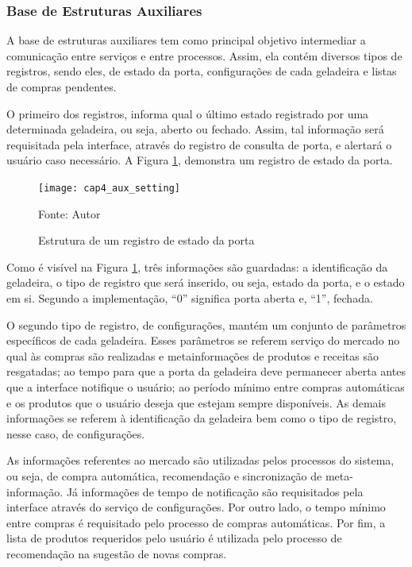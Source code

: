 \subsubsection{Base de Estruturas Auxiliares}

A base de estruturas auxiliares tem como principal objetivo intermediar a comunicação entre serviços e entre processos. Assim, ela contém diversos tipos de registros, sendo eles, de estado da porta, configurações de cada geladeira e listas de compras pendentes.

O primeiro dos registros, informa qual o último estado registrado por uma determinada geladeira, ou seja, aberto ou fechado. Assim, tal informação será requisitada pela interface, através do registro de consulta de porta, e alertará o usuário caso necessário. A Figura \ref{fig:cap4_aux_setting}, demonstra um registro de estado da porta.

\begin{figure}[htb]
    \caption{Estrutura de um registro de estado da porta}
    \label{fig:cap4_aux_setting}
    \texttt{[image: cap4\_aux\_setting]}
    
    Fonte: Autor
\end{figure}

Como é visível na Figura \ref{fig:cap4_aux_setting}, três informações são guardadas: a identificação da geladeira, o tipo de registro que será inserido, ou seja, estado da porta, e o estado em si. Segundo a implementação, ``0'' significa porta aberta e, ``1'', fechada.

O segundo tipo de registro, de configurações, mantém um conjunto de parâmetros específicos de cada geladeira. Esses parâmetros se referem serviço do mercado no qual às compras são realizadas e metainformações de produtos e receitas são resgatadas; ao tempo para que a porta da geladeira deve permanecer aberta antes que a interface notifique o usuário; ao período mínimo entre compras automáticas e os produtos que o usuário deseja que estejam sempre disponíveis. As demais informações se referem à identificação da geladeira bem como o tipo de registro, nesse caso, de configurações.

As informações referentes ao mercado são utilizadas pelos processos do sistema, ou seja, de compra automática, recomendação e sincronização de meta-informação. Já informações de tempo de notificação são requisitados pela interface através do serviço de configurações. Por outro lado, o tempo mínimo entre compras é requisitado pelo processo de compras automáticas. Por fim, a lista de produtos requeridos pelo usuário é utilizada pelo processo de recomendação na sugestão de novas compras.

